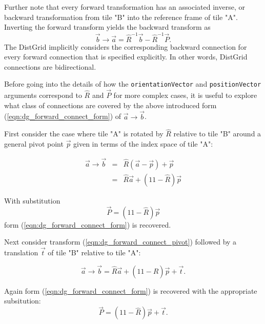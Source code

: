    Further note that every forward transformation has an associated inverse, or
   backward transformation from tile "B" into the reference frame of tile "A". 
   Inverting the forward transform yields the backward transform as
   \begin{equation}
   \vec b \rightarrow \vec a = \hat R^{-1} \vec b - \hat R^{-1} \vec P.
   \end{equation}
   The DistGrid implicitly considers the corresponding backward connection for 
   every forward connection that is specified explicitly. In other words,
   DistGrid connections are bidirectional.
   
   Before going into the details of how the {\tt orientationVector} and 
   {\tt positionVector} arguments correspond to $\hat R$ and $\vec P$ for more
   complex cases, it is useful to explore what class of connections are covered
   by the above introduced form (\ref{eqn:dg_forward_connect_form}) of
   $ \vec a \rightarrow \vec b$.
  
   First consider the case where tile "A" is rotated by $\hat R$
   relative to tile "B" around a general pivot point $\vec p$ given in terms 
   of the index space of tile "A":
  
   \begin{eqnarray}
   \label{eqn:dg_forward_connect_pivot}
   \vec a \rightarrow \vec b & = & \hat R (\vec a - \vec p) + \vec p \nonumber \\
     & = & \hat R \vec a +  ({1\!\!1} - \hat R) \vec p
   \end{eqnarray}
   
   With substitution 
   \begin{equation}
   \vec P = ({1\!\!1} - \hat R) \vec p
   \end{equation}
   form (\ref{eqn:dg_forward_connect_form}) is recovered.
  
   Next consider transform (\ref{eqn:dg_forward_connect_pivot}) followed by
   a translation $\vec t$ of tile "B" relative to tile "A":
  
   \begin{equation}
   \label{eqn:dg_forward_connect_pivot_trans}
   \vec a \rightarrow \vec b =
     \hat R \vec a +  ({1\!\!1} - \hat R) \vec p + \vec t.
   \end{equation}
   
   Again form (\ref{eqn:dg_forward_connect_form}) is recovered with the 
   appropriate subsitution:
   \begin{equation}
   \label{eqn:dg_forward_connect_pivot_trans_pv}
   \vec P = ({1\!\!1} - \hat R) \vec p + \vec t.
   \end{equation}
  
